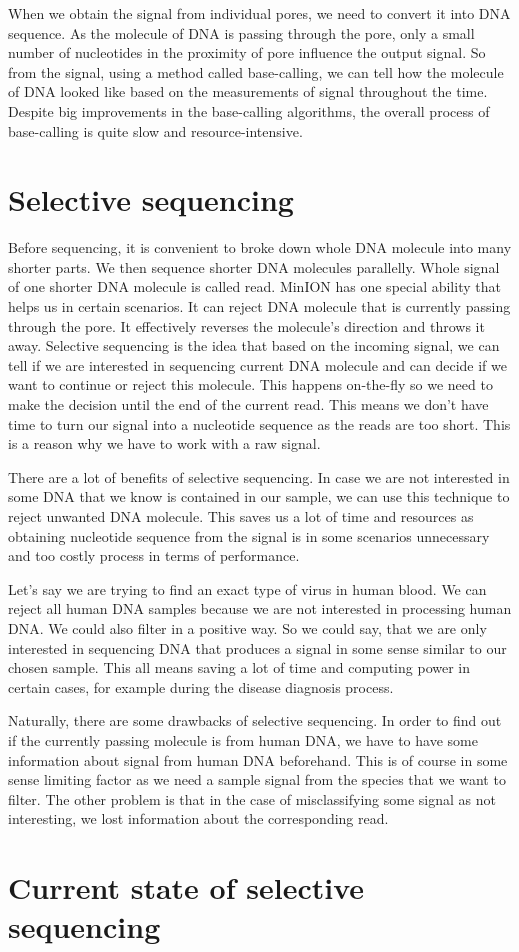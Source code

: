 When we obtain the signal from individual pores, we need to convert it into DNA
sequence. As the molecule of DNA is passing through the pore, only a small
number of nucleotides in the proximity of pore influence the output signal. So from
the signal, using a method called base-calling, we can tell how the molecule of DNA
looked like based on the measurements of signal throughout the time. Despite big
improvements in the base-calling algorithms, the overall process of base-calling
is quite slow and resource-intensive.

\section{Selective sequencing}

Before sequencing, it is convenient to broke down whole DNA molecule into many
shorter parts. We then sequence shorter DNA molecules parallelly. Whole signal
of one shorter DNA molecule is called read.
MinION has one special ability that helps us in certain scenarios. It can reject
DNA molecule that is currently passing
through the pore. It effectively reverses the molecule’s direction and throws it away.
Selective sequencing is the idea that based on the incoming signal, we can tell
if we are interested in sequencing current DNA molecule and can decide if we want
to continue or reject this molecule. This happens on-the-fly so we need to make
the decision until the end of the current read. This means we don't have time to
turn our signal into a nucleotide sequence as the reads are too short. This is
a reason why we have to work with a raw signal.

There are a lot of benefits of selective sequencing. In case we are not interested
in some DNA that we know is contained in our sample, we can use this technique to
reject unwanted DNA molecule. This saves us a lot of time and resources as obtaining
nucleotide sequence from the signal is in some scenarios unnecessary and too
costly process in terms of performance.

Let's say we are trying to find an exact type of virus in human blood. We can
reject all human DNA samples because we are not interested in processing human
DNA. We could also filter in a positive way. So we could say, that we are only
interested in sequencing DNA that produces a signal in some sense similar to our
chosen sample. This all means saving a lot of time and computing power in certain
cases, for example during the disease diagnosis process.

Naturally, there are some drawbacks of selective sequencing. In order to find out
if the currently passing molecule is from human DNA, we have to have some information
about signal from human DNA beforehand.
This is of course in some sense limiting factor as we need a sample signal from
the species that we want to filter. The other problem is that in the case of misclassifying
some signal as not interesting, we lost information about the corresponding
read.

\section{Current state of selective sequencing}

